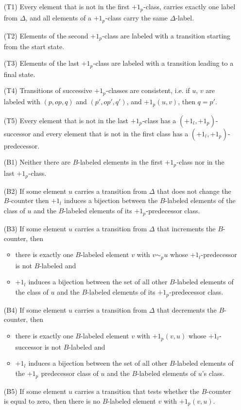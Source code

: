 \documentclass[11pt, a4paper]{article}
\renewcommand{\(}{\left (}
\renewcommand{\)}{\right )}
\theoremstyle{plain}
\newcommand{\psim}[1][]{\ensuremath{\sim_{p_{#1}}}}
\newcommand{\psucc}[1][]{\ensuremath{{+1}_{p_{#1}}}}
\newcommand{\lsucc}[1][]{\ensuremath{{+1_{l_{#1}}}}}
\begin{document}
{  \begin{itemize}
    \item[(T1)] Every element that is not in the first $\psucc$-class, carries exactly one label from $\Delta$, and all elements of a $\psucc$-class carry the same $\Delta$-label.    \item[(T2)] Elements of the second $\psucc$-class are labeled with a transition starting from the start state. 
    \item[(T3)] Elements of the last $\psucc$-class are labeled with a transition leading to a final state.  
    \item[(T4)] Transitions of successive $\psucc$-classes are consistent, i.e. if $u$, $v$ are labeled with $(p, op, q)$ and $(p', op', q')$,
and  $\psucc(u,v)$, then $q = p'$.
   \item[(T5)] Every element that is not in the last $\psucc$-class has a $(\lsucc, \psucc)$-successor and every element that is not in the first class has a $(\lsucc, \psucc)$-predecessor.
  \end{itemize}

  \begin{itemize}
    \item[(B1)] Neither there are $B$-labeled elements in the first $\psucc$-class nor in the last \psucc-class.
      \item[(B2)] If some element $u$ carries a transition from $\Delta$ that does not change the $B$-counter then $\lsucc$ induces a bijection between the $B$-labeled elements of the class of $u$ and  the $B$-labeled elements of its \psucc-predecessor class.
    \item[(B3)] If some element $u$ carries a transition from $\Delta$ that increments the $B$-counter, then 
      \begin{itemize}
	\item there is exactly one $B$-labeled element $v$ with $v \psim u$ whose \lsucc-predecessor is not $B$-labeled and
        \item $\lsucc$ induces a bijection between the set of all other $B$-labeled elements of the class of $u$ and the $B$-labeled elements of its \psucc-predecessor class.
    \end{itemize}
    \item[(B4)] If some element $u$ carries a transition from $\Delta$ that decrements the $B$-counter, then
      \begin{itemize}
	\item there is exactly one $B$-labeled element $v$ with $\psucc(v,u)$ whose \lsucc-successor is not $B$-labeled and
        \item $\lsucc$ induces a bijection between the set of all other $B$-labeled elements of the $\psucc$ predecessor class of $u$ and the $B$-labeled elements of $u$'s class.
    \end{itemize}
      \item[(B5)] If some element $u$ carries a transition that tests whether the $B$-counter is equal to zero, then there is no $B$-labeled element $v$ with $\psucc(v,u)$.
  \end{itemize}

}
\end{document}
